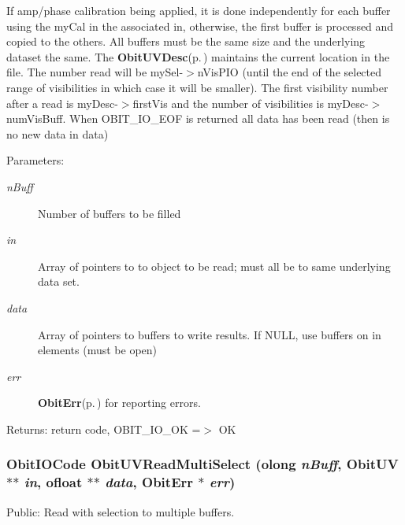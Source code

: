 If amp/phase calibration being applied, it is done independently for each buffer using the my\-Cal in the associated in, otherwise, the first buffer is processed and copied to the others. All buffers must be the same size and the underlying dataset the same. The {\bf Obit\-UVDesc}{\rm (p.\,\pageref{structObitUVDesc})} maintains the current location in the file. The number read will be my\-Sel-$>$n\-Vis\-PIO (until the end of the selected range of visibilities in which case it will be smaller). The first visibility number after a read is my\-Desc-$>$first\-Vis and the number of visibilities is my\-Desc-$>$num\-Vis\-Buff. When OBIT\_\-IO\_\-EOF is returned all data has been read (then is no new data in data) \begin{Desc}
\item[Parameters:]
\begin{description}
\item[{\em n\-Buff}]Number of buffers to be filled \item[{\em in}]Array of pointers to to object to be read; must all be to same underlying data set. \item[{\em data}]Array of pointers to buffers to write results. If NULL, use buffers on in elements (must be open) \item[{\em err}]{\bf Obit\-Err}{\rm (p.\,\pageref{structObitErr})} for reporting errors. \end{description}
\end{Desc}
\begin{Desc}
\item[Returns:]return code, OBIT\_\-IO\_\-OK =$>$ OK \end{Desc}
\subsubsection{\setlength{\rightskip}{0pt plus 5cm}Obit\-IOCode Obit\-UVRead\-Multi\-Select ({\bf olong} {\em n\-Buff}, {\bf Obit\-UV} $\ast$$\ast$ {\em in}, {\bf ofloat} $\ast$$\ast$ {\em data}, {\bf Obit\-Err} $\ast$ {\em err})}\label{ObitUV_8h_a41}


Public: Read with selection to multiple buffers. 

